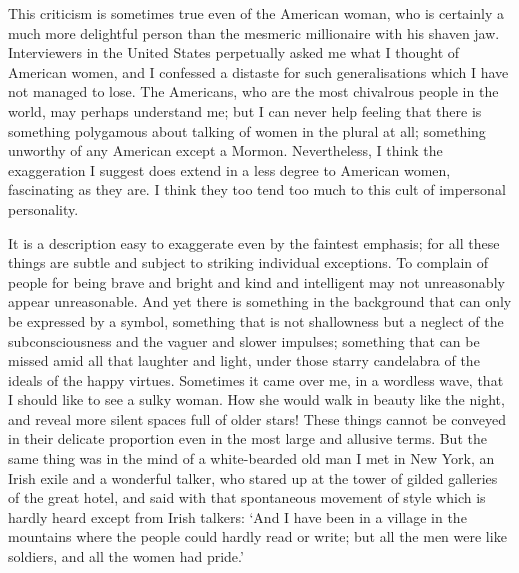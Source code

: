 \documentclass{book}
\begin{document}
This criticism is sometimes true even of the American woman, who is certainly a much more delightful person than the mesmeric millionaire with his shaven jaw. Interviewers in the United States perpetually asked me what I thought of American women, and I confessed a distaste for such generalisations which I have not managed to lose. The Americans, who are the most chivalrous people in the world, may perhaps understand me; but I can never help feeling that there is something polygamous about talking of women in the plural at all; something unworthy of any American except a Mormon. Nevertheless, I think the exaggeration I suggest does extend in a less degree to American women, fascinating as they are. I think they too tend too much to this cult of impersonal personality.

It is a description easy to exaggerate even by the faintest emphasis; for all these things are subtle and subject to striking individual exceptions. To complain of people for being brave and bright and kind and intelligent may not unreasonably appear unreasonable. And yet there is something in the background that can only be expressed by a symbol, something that is not shallowness but a neglect of the subconsciousness and the vaguer and slower impulses; something that can be missed amid all that laughter and light, under those starry candelabra of the ideals of the happy virtues. Sometimes it came over me, in a wordless wave, that I should like to see a sulky woman. How she would walk in beauty like the night, and reveal more silent spaces full of older stars! These things cannot be conveyed in their delicate proportion even in the most large and allusive terms. But the same thing was in the mind of a white-bearded old man I met in New York, an Irish exile and a wonderful talker, who stared up at the tower of gilded galleries of the great hotel, and said with that spontaneous movement of style which is hardly heard except from Irish talkers: ‘And I have been in a village in the mountains where the people could hardly read or write; but all the men were like soldiers, and all the women had pride.’
\end{document}
